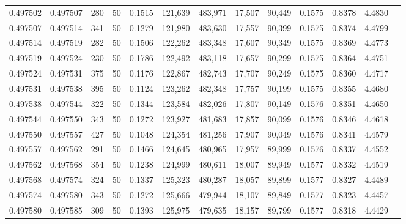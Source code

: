 \begin{tabular}{rrrrrrrrrrrrr}
0.497502 & 0.497507 & 280 &  50 &                                     0.1515 & 121,639 & 483,971 &  17,507 &  90,449 & 0.1575 & 0.8378 & 4.4830 \\
0.497507 & 0.497514 & 341 &  50 &                                     0.1279 & 121,980 & 483,630 &  17,557 &  90,399 & 0.1575 & 0.8374 & 4.4799 \\
0.497514 & 0.497519 & 282 &  50 &                                     0.1506 & 122,262 & 483,348 &  17,607 &  90,349 & 0.1575 & 0.8369 & 4.4773 \\
0.497519 & 0.497524 & 230 &  50 &                                     0.1786 & 122,492 & 483,118 &  17,657 &  90,299 & 0.1575 & 0.8364 & 4.4751 \\
0.497524 & 0.497531 & 375 &  50 &                                     0.1176 & 122,867 & 482,743 &  17,707 &  90,249 & 0.1575 & 0.8360 & 4.4717 \\
0.497531 & 0.497538 & 395 &  50 &                                     0.1124 & 123,262 & 482,348 &  17,757 &  90,199 & 0.1575 & 0.8355 & 4.4680 \\
0.497538 & 0.497544 & 322 &  50 &                                     0.1344 & 123,584 & 482,026 &  17,807 &  90,149 & 0.1576 & 0.8351 & 4.4650 \\
0.497544 & 0.497550 & 343 &  50 &                                     0.1272 & 123,927 & 481,683 &  17,857 &  90,099 & 0.1576 & 0.8346 & 4.4618 \\
0.497550 & 0.497557 & 427 &  50 &                                     0.1048 & 124,354 & 481,256 &  17,907 &  90,049 & 0.1576 & 0.8341 & 4.4579 \\
0.497557 & 0.497562 & 291 &  50 &                                     0.1466 & 124,645 & 480,965 &  17,957 &  89,999 & 0.1576 & 0.8337 & 4.4552 \\
0.497562 & 0.497568 & 354 &  50 &                                     0.1238 & 124,999 & 480,611 &  18,007 &  89,949 & 0.1577 & 0.8332 & 4.4519 \\
0.497568 & 0.497574 & 324 &  50 &                                     0.1337 & 125,323 & 480,287 &  18,057 &  89,899 & 0.1577 & 0.8327 & 4.4489 \\
0.497574 & 0.497580 & 343 &  50 &                                     0.1272 & 125,666 & 479,944 &  18,107 &  89,849 & 0.1577 & 0.8323 & 4.4457 \\
0.497580 & 0.497585 & 309 &  50 &                                     0.1393 & 125,975 & 479,635 &  18,157 &  89,799 & 0.1577 & 0.8318 & 4.4429 \\

\end{tabular}

